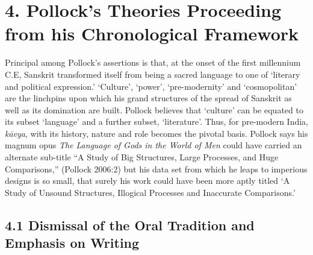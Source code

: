 
\section*{4. Pollock’s Theories Proceeding from his Chronological Framework}

Principal among Pollock’s assertions is that, at the onset of the first millennium C.E, Sanskrit transformed itself from being a sacred language to one of ‘literary and political expression.’ ‘Culture’, ‘power’, ‘pre-modernity’ and ‘cosmopolitan’ are the linchpins upon which his grand structures of the spread of Sanskrit as well as its domination are built. Pollock believes that ‘culture’ can be equated to its subset ‘language’ and a further subset, ‘literature’. Thus, for pre-modern India, \textit{kāvya}, with its history, nature and role becomes the pivotal basis. Pollock says his magnum opus \textit{The Language of Gods in the World of Men} could have carried an alternate sub-title “A Study of Big Structures, Large Processes, and Huge Comparisons,” (Pollock 2006:2) but his data set from which he leaps to imperious designs is so small, that surely his work could have been more aptly titled ‘A Study of Unsound Structures, Illogical Processes and Inaccurate Comparisons.’

\subsection*{4.1 Dismissal of the Oral Tradition and Emphasis on Writing}

